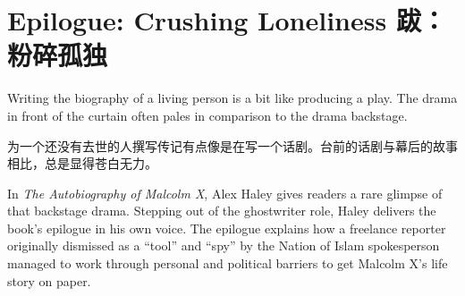 

\chapter{\ifdefined\eng
Epilogue: Crushing Loneliness
\fi
\ifdefined\chs
跋：粉碎孤独
\fi}



\ifdefined\eng
Writing the biography of a living person is a bit like producing a play. The drama in front of the curtain often pales in comparison to the drama backstage.
\fi

\ifdefined\chs
为一个还没有去世的人撰写传记有点像是在写一个话剧。台前的话剧与幕后的故事相比，总是显得苍白无力。
\fi

\ifdefined\eng
In \textit{The Autobiography of Malcolm X}, Alex Haley gives readers a rare glimpse of that backstage drama. Stepping out of the ghostwriter role, Haley delivers the book's epilogue in his own voice. The epilogue explains how a freelance reporter originally dismissed as a ``tool'' and ``spy'' by the Nation of Islam spokesperson managed to work through personal and political barriers to get Malcolm X's life story on paper.
\fi

